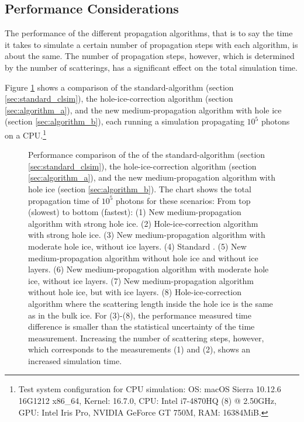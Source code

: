 
\subsection{Performance Considerations}
\label{sec:performance}

The performance of the different propagation algorithms, that is to say the time it takes to simulate a certain number of propagation steps with each algorithm, is about the same. The number of propagation steps, however, which is determined by the number of scatterings, has a significant effect on the total simulation time.

Figure \ref{fig:Go7Maquo} shows a comparison of the standard-\clsim algorithm (section \ref{sec:standard_clsim}), the hole-ice-correction algorithm (section \ref{sec:algorithm_a}), and the new medium-propagation algorithm with hole ice (section \ref{sec:algorithm_b}), each running a simulation propagating $10^5$ photons on a CPU.\footnote{Test system configuration for CPU simulation: OS: macOS Sierra 10.12.6 16G1212 x86\_64, Kernel: 16.7.0, CPU: Intel i7-4870HQ (8) @ 2.50GHz, GPU: Intel Iris Pro, NVIDIA GeForce GT 750M, RAM: 16384MiB.}

\begin{figure}[htbp]
  \caption{Performance comparison of the of the standard-\clsim algorithm (section \ref{sec:standard_clsim}), the hole-ice-correction algorithm (section \ref{sec:algorithm_a}), and the new medium-propagation algorithm with hole ice (section \ref{sec:algorithm_b}). The chart shows the total propagation time of $10^5$ photons for these scenarios: From top (slowest) to bottom (fastest): (1) New medium-propagation algorithm with strong hole ice. (2) Hole-ice-correction algorithm with strong hole ice. (3) New medium-propagation algorithm with moderate hole ice, without ice layers. (4) Standard \clsim. (5) New medium-propagation algorithm without hole ice and without ice layers. (6) New medium-propagation algorithm with moderate hole ice, without ice layers. (7) New medium-propagation algorithm without hole ice, but with ice layers. (8) Hole-ice-correction algorithm where the scattering length inside the hole ice is the same as in the bulk ice. For (3)-(8), the performance measured time difference is smaller than the statistical uncertainty of the time measurement. Increasing the number of scattering steps, however, which corresponds to the measurements (1) and (2), shows an increased simulation time.}
  \label{fig:Go7Maquo}
\end{figure}

